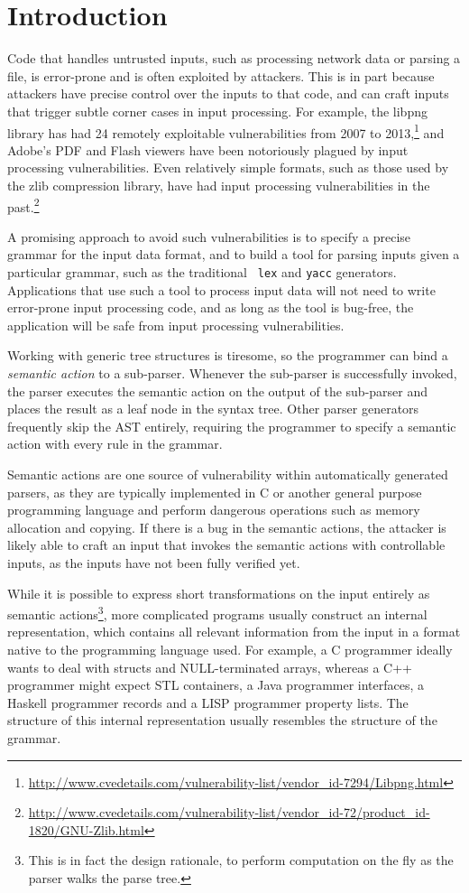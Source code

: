 \section{Introduction}

Code that handles untrusted inputs, such as processing network
data or parsing a file, is error-prone and is often exploited by
attackers.  This is in part because attackers have precise control
over the inputs to that code, and can craft inputs that trigger
subtle corner cases in input processing.  For example, the libpng
library has had 24 remotely exploitable vulnerabilities from 2007 to
2013,\footnote{\url{http://www.cvedetails.com/vulnerability-list/vendor_id-7294/Libpng.html}}
and Adobe's PDF and Flash viewers have been notoriously
plagued by input processing vulnerabilities.  Even relatively
simple formats, such as those used by the zlib compression
library, have had input processing vulnerabilities in the
past.\footnote{\url{http://www.cvedetails.com/vulnerability-list/vendor_id-72/product_id-1820/GNU-Zlib.html}}

A promising approach to avoid such vulnerabilities is to specify
a precise grammar for the input data format, and to build a tool for
parsing inputs given a particular grammar, such as the traditional {\tt
lex} and {\tt yacc} generators.  Applications that use such a tool to
process input data will not need to write error-prone input processing
code, and as long as the tool is bug-free, the application will be safe
from input processing vulnerabilities.

Working with generic tree structures is tiresome, so the programmer can
bind a \textit{semantic action} to a sub-parser. Whenever the sub-parser
is successfully invoked, the parser executes the semantic action on the
output of the sub-parser and places the result as a leaf node in the
syntax tree. Other parser generators frequently skip the AST entirely,
requiring the programmer to specify a semantic action with every rule
in the grammar.

Semantic actions are one source of vulnerability within automatically
generated parsers, as they are typically implemented in C or another
general purpose programming language and perform dangerous operations
such as memory allocation and copying. If there is a bug in the semantic
actions, the attacker is likely able to craft an input that invokes the
semantic actions with controllable inputs, as the inputs have not been
fully verified yet.

While it is possible to express short transformations on the input
entirely as semantic actions\footnote{This is in fact the design
rationale, to perform computation on the fly as the parser walks the
parse tree.}, more complicated programs usually construct an internal
representation, which contains all relevant information from the input
in a format native to the programming language used. For example, a C
programmer ideally wants to deal with structs and NULL-terminated arrays,
whereas a C++ programmer might expect STL containers, a Java programmer
interfaces, a Haskell programmer records and a LISP programmer property
lists.  The structure of this internal representation usually resembles
the structure of the grammar.

